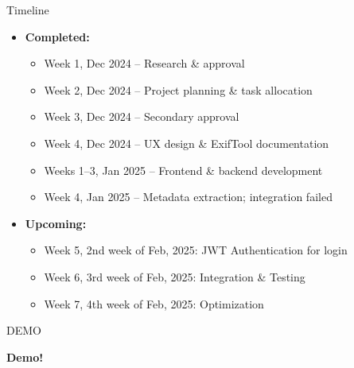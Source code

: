 \documentclass{beamer}
\begin{document}
\begin{frame}{Timeline}
    \begin{itemize}    
           \item \textbf{Completed:}
        \begin{itemize}
            \item Week 1, Dec 2024 – Research \& approval 
            \item Week 2, Dec 2024 – Project planning \& task allocation
            \item Week 3, Dec 2024 – Secondary approval 
            \item Week 4, Dec 2024 – UX design \& ExifTool documentation
            \item Weeks 1–3, Jan 2025 – Frontend \& backend development 
            \item Week 4, Jan 2025 – Metadata extraction; integration failed
            
        \end{itemize}
        \item \textbf{Upcoming:}
        \begin{itemize}
            \item Week 5, 2nd week of Feb, 2025: JWT Authentication for login
            \item Week 6, 3rd week of Feb, 2025: Integration \& Testing
            \item Week 7, 4th week of Feb, 2025: Optimization
        \end{itemize}
    \end{itemize}
\end{frame}

\begin{frame}{DEMO}
\begin{center}
        \textbf{Demo!}\\        
    \end{center}
    \vspace{1cm}
    
\end{frame}
\end{document}
